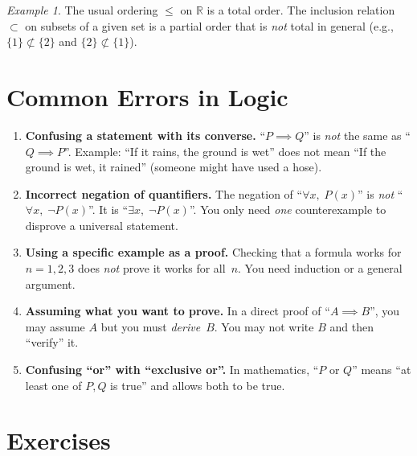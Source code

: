 \documentclass[12pt,a4paper,openany]{book}
\newcommand{\R}{\mathbb{R}}
\theoremstyle{definition}
\theoremstyle{remark}
\newtheorem{example}{Example}[chapter]
\begin{document}
\begin{example}
The usual ordering $\leq$ on $\R$ is a total order.  The inclusion relation
$\subset$ on subsets of a given set is a partial order that is \emph{not}
total in general (e.g., $\{1\} \not\subset \{2\}$ and $\{2\} \not\subset
\{1\}$).
\end{example}

\section{Common Errors in Logic}
\label{sec:common-errors-logic}

\begin{commonerrors}
\begin{enumerate}[label=\textbf{\arabic*.}]
  \item \textbf{Confusing a statement with its converse.}\quad
    ``$P \implies Q$'' is \emph{not} the same as ``$Q \implies P$''.
    Example: ``If it rains, the ground is wet'' does not mean ``If the
    ground is wet, it rained'' (someone might have used a hose).

  \item \textbf{Incorrect negation of quantifiers.}\quad
    The negation of ``$\forall x,\; P(x)$'' is \emph{not}
    ``$\forall x,\; \neg P(x)$''.  It is ``$\exists x,\; \neg P(x)$''.
    You only need \emph{one} counterexample to disprove a universal
    statement.

  \item \textbf{Using a specific example as a proof.}\quad
    Checking that a formula works for $n=1,2,3$ does \emph{not} prove it
    works for all~$n$.  You need induction or a general argument.

  \item \textbf{Assuming what you want to prove.}\quad
    In a direct proof of ``$A \implies B$'', you may assume $A$ but you
    must \emph{derive}~$B$.  You may not write $B$ and then ``verify'' it.

  \item \textbf{Confusing ``or'' with ``exclusive or''.}\quad
    In mathematics, ``$P$ or $Q$'' means ``at least one of $P,Q$ is true''
    and allows both to be true.
\end{enumerate}
\end{commonerrors}

\section{Exercises}
\label{sec:exercises-ch1}
\end{document}
